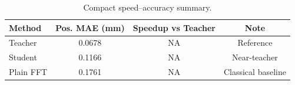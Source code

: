 \begin{table}[t]
\centering
\caption{Compact speed--accuracy summary.}
\label{tab:compact_speed}
\begin{tabular}{lccc}
\hline
Method & Pos. MAE (mm) & Speedup vs Teacher & Note \\ 
\hline
Teacher & 0.0678 & NA & Reference \\
Student & 0.1166 & NA & Near-teacher \\
Plain FFT & 0.1761 & NA & Classical baseline \\
\hline
\end{tabular}
\end{table}
